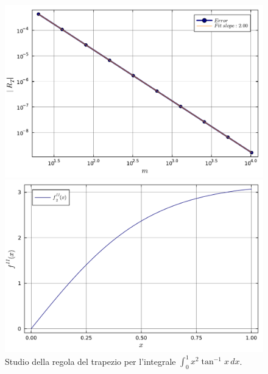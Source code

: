 \documentclass[letterpaper, 12pt]{article}
\begin{document}
\begin{figure}[!ht]
    \centering
    \begin{minipage}[b]{0.47\textwidth}
        \includegraphics[width=\textwidth]{5122.pdf}
    \end{minipage}
    \hspace{0.5cm}
    \begin{minipage}[b]{0.47\textwidth}
        \includegraphics[width=\textwidth]{5122_2.pdf}
    \end{minipage}
    \caption{Studio della regola del trapezio per l'integrale $\int_0^1 x^2 \tan^{-1}x\, dx$.}
    \label{fig:es5_1_2_2}
\end{figure}
\end{document}
